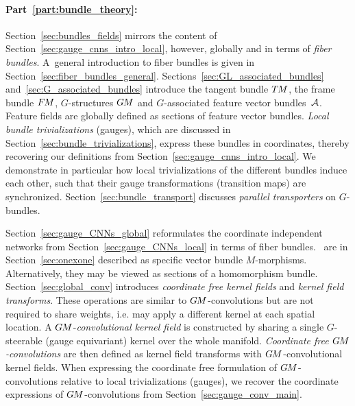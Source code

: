 \paragraph{Part~\ref{part:bundle_theory}:}

Section~\ref{sec:bundles_fields} mirrors the content of Section~\ref{sec:gauge_cnns_intro_local}, however, globally and in terms of \emph{fiber bundles}.
A~general introduction to fiber bundles is given in Section~\ref{sec:fiber_bundles_general}.
Sections~\ref{sec:GL_associated_bundles} and~\ref{sec:G_associated_bundles} introduce the tangent bundle $T\mkern-1.5muM$, the frame bundle $F\mkern-1.5muM$, $G$-structures $G\mkern-1.4muM$ and $G$-associated feature vector bundles~$\mathcal{A}$.
Feature fields are globally defined as sections of feature vector bundles.
\emph{Local bundle trivializations} (gauges), which are discussed in Section~\ref{sec:bundle_trivializations}, express these bundles in coordinates, thereby recovering our definitions from Section~\ref{sec:gauge_cnns_intro_local}.
We demonstrate in particular how local trivializations of the different bundles induce each other, such that their gauge transformations (transition maps) are synchronized.
Section~\ref{sec:bundle_transport} discusses \emph{parallel transporters} on $G$-bundles.

Section~\ref{sec:gauge_CNNs_global} reformulates the coordinate independent networks from Section~\ref{sec:gauge_CNNs_local} in terms of fiber bundles.
\onexonesit\ are in Section~\ref{sec:onexone} described as specific vector bundle $M$-morphisms.
Alternatively, they may be viewed as sections of a homomorphism bundle.
Section~\ref{sec:global_conv} introduces \emph{coordinate free kernel fields} and \emph{kernel field transforms}.
These operations are similar to $G\mkern-1.4muM$-convolutions but are not required to share weights, i.e. may apply a different kernel at each spatial location.
A $G\mkern-1.4muM$-\emph{convolutional kernel field} is constructed by sharing a single $G$-steerable (gauge equivariant) kernel over the whole manifold.
\emph{Coordinate free $G\mkern-1.4muM$-convolutions} are then defined as kernel field transforms with $G\mkern-1.4muM$-convolutional kernel fields.
When expressing the coordinate free formulation of $G\mkern-1.4muM$-convolutions relative to local trivializations (gauges), we recover the coordinate expressions of $G\mkern-1.4muM$-convolutions from Section~\ref{sec:gauge_conv_main}.

